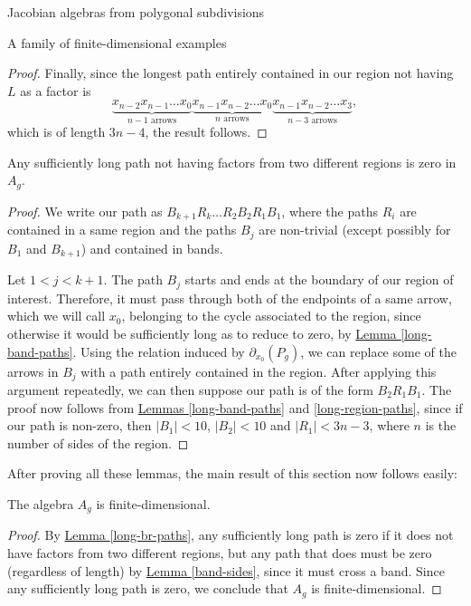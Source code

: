\begin{chapter}{Jacobian algebras from polygonal subdivisions}
\begin{section}{A family of finite-dimensional examples}
\begin{proof}
Finally, since the longest path entirely contained in our region not having $L$ as a factor is
\[\underbrace{x_{n-2}x_{n-1}\dots x_0}_{\text{$n-1$ arrows}}\underbrace{x_{n-1}x_{n-2}\dots x_0}_{\text{$n$ arrows}}\underbrace{x_{n-1}x_{n-2}\dots x_3}_{\text{$n-3$ arrows}},\]
which is of length $3n-4$, the result follows.
\end{proof}

\begin{lemma} \label{long-br-paths} Any sufficiently long path not having factors from two different regions is zero in $A_g$.
\end{lemma}
\begin{proof} We write our path as $B_{k+1}R_k\dots R_2 B_2 R_1 B_1$, where the paths $R_i$ are contained in a same region and the paths $B_j$ are non-trivial (except possibly for $B_1$ and $B_{k+1}$) and contained in bands.

Let $1<j<k+1$. The path $B_j$ starts and ends at the boundary of our region of interest. Therefore, it must pass through both of the endpoints of a same arrow, which we will call $x_0$, belonging to the cycle associated to the region, since otherwise it would be sufficiently long as to reduce to zero, by \hyperref[long-band-paths]{Lemma \ref*{long-band-paths}}. Using the relation induced by $\partial_{x_0}(P_g)$, we can replace some of the arrows in $B_j$ with a path entirely contained in the region.
After applying this argument repeatedly, we can then suppose our path is of the form $B_2 R_1 B_1$. The proof now follows from \hyperref[long-band-paths]{Lemmas \ref*{long-band-paths}} and \ref{long-region-paths}, since if our path is non-zero, then $|B_1|<10$, $|B_2|<10$ and $|R_1|<3n-3$, where $n$ is the number of sides of the region.
\end{proof}

After proving all these lemmas, the main result of this section now follows easily:

\begin{thm} The algebra $A_g$ is finite-dimensional.
\end{thm}
\begin{proof} By \hyperref[long-br-paths]{Lemma \ref*{long-br-paths}}, any sufficiently long path is zero if it does not have factors from two different regions, but any path that does must be zero (regardless of length) by \hyperref[band-sides]{Lemma \ref*{band-sides}}, since it must cross a band. Since any sufficiently long path is zero, we conclude that $A_g$ is finite-dimensional.
\end{proof}
\end{section}


\end{chapter}
